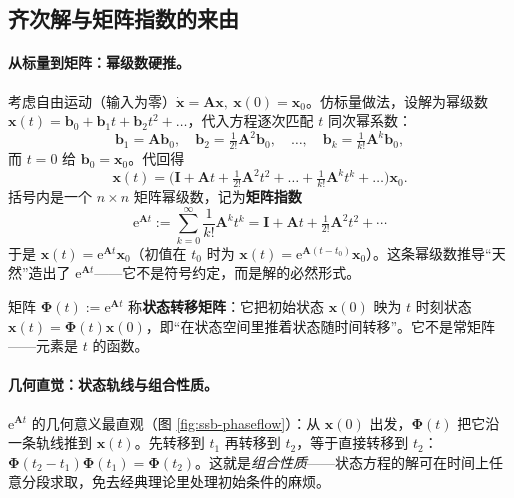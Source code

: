 \subsection{齐次解与矩阵指数的来由}
\label{sec:ssb-homog}

\paragraph{从标量到矩阵：幂级数硬推。}
考虑自由运动（输入为零）$\dot{\mathbf{x}}=\mathbf{A}\mathbf{x},\ \mathbf{x}(0)=\mathbf{x}_0$。仿标量做法，设解为幂级数 $\mathbf{x}(t)=\mathbf{b}_0+\mathbf{b}_1 t+\mathbf{b}_2 t^2+\dots$，代入方程逐次匹配 $t$ 同次幂系数：
\[
  \mathbf{b}_1=\mathbf{A}\mathbf{b}_0,\quad \mathbf{b}_2=\tfrac{1}{2!}\mathbf{A}^2\mathbf{b}_0,\quad\dots,\quad \mathbf{b}_k=\tfrac{1}{k!}\mathbf{A}^k\mathbf{b}_0,
\]
而 $t=0$ 给 $\mathbf{b}_0=\mathbf{x}_0$。代回得
\begin{equation}
  \mathbf{x}(t)=\Big(\mathbf{I}+\mathbf{A}t+\tfrac{1}{2!}\mathbf{A}^2 t^2+\dots+\tfrac{1}{k!}\mathbf{A}^k t^k+\dots\Big)\mathbf{x}_0.
  \label{eq:ssb-series-sol}
\end{equation}
括号内是一个 $n\times n$ 矩阵幂级数，记为\textbf{矩阵指数}
\begin{equation}
  \boxed{\;\mathrm{e}^{\mathbf{A}t}:=\sum_{k=0}^{\infty}\frac{1}{k!}\mathbf{A}^k t^k=\mathbf{I}+\mathbf{A}t+\tfrac{1}{2!}\mathbf{A}^2t^2+\cdots\;}
  \label{eq:ssb-expm-def}
\end{equation}
于是 $\mathbf{x}(t)=\mathrm{e}^{\mathbf{A}t}\mathbf{x}_0$（初值在 $t_0$ 时为 $\mathbf{x}(t)=\mathrm{e}^{\mathbf{A}(t-t_0)}\mathbf{x}_0$）。这条幂级数推导“天然”造出了 $\mathrm{e}^{\mathbf{A}t}$——它不是符号约定，而是解的必然形式。

\begin{definition}[状态转移矩阵]\label{def:ssb-stm}
矩阵 $\boldsymbol{\Phi}(t):=\mathrm{e}^{\mathbf{A}t}$ 称\textbf{状态转移矩阵}：它把初始状态 $\mathbf{x}(0)$ 映为 $t$ 时刻状态 $\mathbf{x}(t)=\boldsymbol{\Phi}(t)\mathbf{x}(0)$，即“在状态空间里推着状态随时间转移”。它不是常矩阵——元素是 $t$ 的函数。
\end{definition}

\paragraph{几何直觉：状态轨线与组合性质。}
$\mathrm{e}^{\mathbf{A}t}$ 的几何意义最直观（图 \ref{fig:ssb-phaseflow}）：从 $\mathbf{x}(0)$ 出发，$\boldsymbol{\Phi}(t)$ 把它沿一条轨线推到 $\mathbf{x}(t)$。先转移到 $t_1$ 再转移到 $t_2$，等于直接转移到 $t_2$：$\boldsymbol{\Phi}(t_2-t_1)\boldsymbol{\Phi}(t_1)=\boldsymbol{\Phi}(t_2)$。这就是\emph{组合性质}——状态方程的解可在时间上任意分段求取，免去经典理论里处理初始条件的麻烦。

